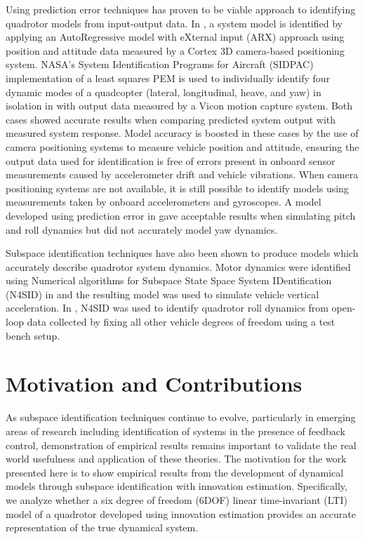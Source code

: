 Using prediction error techniques has proven to be viable approach to identifying quadrotor models from input-output data. In \cite{chamberlain2011system}, a system model is identified by applying an AutoRegressive model with eXternal input (ARX) approach using position and attitude data measured by a Cortex 3D camera-based positioning system. NASA's System Identification Programs for Aircraft (SIDPAC) implementation of a least squares PEM is used to individually identify four dynamic modes of a quadcopter (lateral, longitudinal, heave, and yaw) in isolation in \cite{miller2011open} with output data measured by a Vicon motion capture system. Both cases showed accurate results when comparing predicted system output with measured system response. Model accuracy is boosted in these cases by the use of camera positioning systems to measure vehicle position and attitude, ensuring the output data used for identification is free of errors present in onboard sensor measurements caused by accelerometer drift and vehicle vibrations. When camera positioning systems are not available, it is still possible to identify models using measurements taken by onboard accelerometers and gyroscopes.  A model developed using prediction error in \cite{lee2011attitude} gave acceptable results when simulating pitch and roll dynamics but did not accurately model yaw dynamics.

Subspace identification techniques have also been shown to produce models which accurately describe quadrotor system dynamics. Motor dynamics were identified using Numerical algorithms for Subspace State Space System IDentification (N4SID) in \cite{kis2011sensor} and the resulting model was used to simulate vehicle vertical acceleration. In \cite{batmazdesign}, N4SID was used to identify quadrotor roll dynamics from open-loop data collected by fixing all other vehicle degrees of freedom using a test bench setup. 


\section{Motivation and Contributions}
As subspace identification techniques continue to evolve, particularly in emerging areas of research including identification of systems in the presence of feedback control, demonstration of empirical results remains important to validate the real world usefulness and application of these theories. The motivation for the work presented here is to show empirical results from the development of dynamical models through subspace identification with innovation estimation. Specifically, we analyze whether a six degree of freedom (6DOF) linear time-invariant (LTI) model of a quadrotor developed using innovation estimation provides an accurate representation of the true dynamical system.




